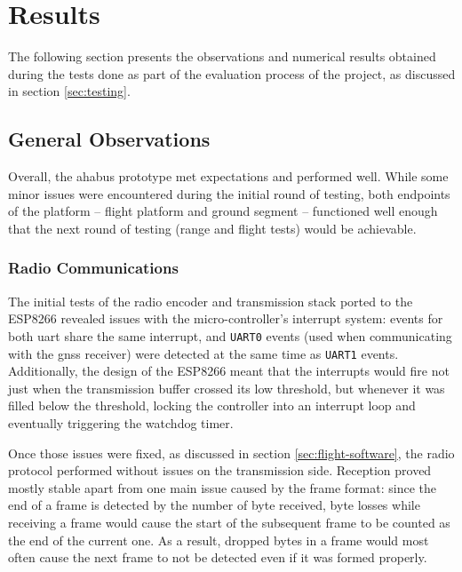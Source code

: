\chapter{Results}
\label{ch:results}

The following section presents the observations and numerical results obtained
during the tests done as part of the evaluation process of the project, as
discussed in section \ref{sec:testing}.

\section{General Observations}

Overall, the \acrshort{ahabus} prototype met expectations and performed well.
While some minor issues were encountered during the initial round of testing,
both endpoints of the platform – flight platform and ground segment – functioned
well enough that the next round of testing (range and flight tests) would be
achievable.

\subsection{Radio Communications}
\label{ssec:results-rtx}

The initial tests of the radio encoder and transmission stack ported to the
ESP8266 revealed issues with the micro-controller's interrupt system: events for
both \acrshort{uart} share the same interrupt, and \texttt{UART0} events (used
when communicating with the \acrshort{gnss} receiver) were detected at the same
time as \texttt{UART1} events. Additionally, the design of the ESP8266 meant
that the interrupts would fire not just when the transmission buffer crossed
its low threshold, but whenever it was filled below the threshold, locking the
controller into an interrupt loop and eventually triggering the watchdog timer.

Once those issues were fixed, as discussed in section \ref{sec:flight-software},
the radio protocol performed without issues on the transmission side. Reception
proved mostly stable apart from one main issue caused by the frame format: since
the end of a frame is detected by the number of byte received, byte losses
while receiving a frame would cause the start of the subsequent frame to be
counted as the end of the current one. As a result, dropped bytes in a frame
would most often cause the next frame to not be detected even if it was formed
properly.

